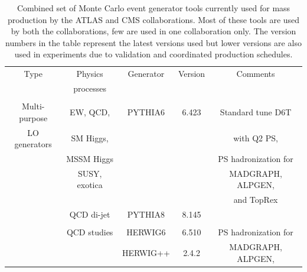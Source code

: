 \begin{table}[t]
\begin{center}
\caption{Combined set of Monte Carlo event generator tools currently used for mass production by the ATLAS and CMS collaborations.  Most of these tools are used by both the collaborations, few are used in one collaboration only.  The version numbers in the table represent the latest versions used but lower versions are also used in experiments due to validation and coordinated production schedules.}
\footnotesize{
\begin{tabular}{|c|c|c|c|c|} \hline
Type               &    Physics        &	Generator &	Version       &	Comments \\  
             &     processes       &	 &	      &	 \\  
\hline %
                       &                                       &                       &                      &                       \\  
Multi-purpose & 	EW, QCD,            &      PYTHIA6   &    6.423      & Standard tune D6T  \\
LO generators     & SM Higgs,                      &	                  &	                   &   with Q2 PS,            \\
                       &   MSSM Higgs                 &                       &                      &  PS hadronization  for                      \\  
                       & SUSY, exotica                &                        &                      & MADGRAPH, ALPGEN, \\   
                       &                                      &                        &                       &and TopRex   \\  
                       &    QCD di-jet                  &   PYTHIA8      &    8.145          &                                 \\  
                       &                                      &                        &                       &                       \\  
                       &  QCD studies                 &  HERWIG6    &     6.510        &  PS hadronization  for   \\  
                       &                                       & HERWIG++  &    2.4.2          & MADGRAPH, ALPGEN,  \\  

\end{tabular}}
\end{center}
\end{table}
